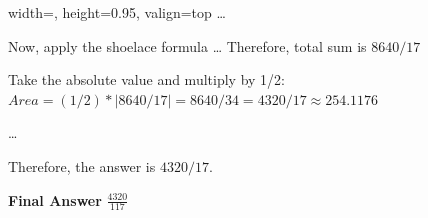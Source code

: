 \begin{figure}[t]
\begin{minipage}[t]{0.32\textwidth}
\begin{bluebox}{width=\linewidth, 
height=0.95\textheight, valign=top}
\ldots

Now, apply the shoelace formula \ldots
Therefore, total sum is $8640/17$

Take the absolute value and multiply by 1/2: $Area = (1/2)*|8640/17| = 8640/34 = 4320/17 \approx 254.1176$

\ldots

Therefore, the answer is $4320/17$.

\endgroup
\textbf{Final Answer} $\boxed{\frac{4320}{117}}$ \xmark
\end{bluebox}
\end{minipage}
\end{figure}













